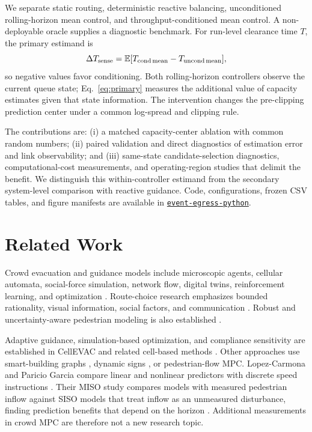 \documentclass[conference]{IEEEtran}
\newcommand{\cond}{\mathrm{cond}}
\newcommand{\uncond}{\mathrm{uncond}}
\begin{document}
We separate static routing, deterministic reactive balancing, unconditioned rolling-horizon mean control, and throughput-conditioned mean control. A non-deployable oracle supplies a diagnostic benchmark. For run-level clearance time $T$, the primary estimand is
\begin{equation}
\Delta T_{\rm sense}=\mathbb E[T_{\cond\,\rm mean}-T_{\uncond\,\rm mean}],
\label{eq:primary}
\end{equation}
so negative values favor conditioning. Both rolling-horizon controllers observe the current queue state; Eq.~\eqref{eq:primary} measures the additional value of capacity estimates given that state information. The intervention changes the pre-clipping prediction center under a common log-spread and clipping rule.

The contributions are: (i) a matched capacity-center ablation with common random numbers; (ii) paired validation and direct diagnostics of estimation error and link observability; and (iii) same-state candidate-selection diagnostics, computational-cost measurements, and operating-region studies that delimit the benefit. We distinguish this within-controller estimand from the secondary system-level comparison with reactive guidance. Code, configurations, frozen CSV tables, and figure manifests are available in \href{https://github.com/skcKenneth/event-egress-python}{\texttt{event-egress-python}}.

\section{Related Work}
Crowd evacuation and guidance models include microscopic agents, cellular automata, social-force simulation, network flow, digital twins, reinforcement learning, and optimization \cite{owaidah2019review,zhou2019simulation,han2020smart,xie2025coordinating}. Route-choice research emphasizes bounded rationality, visual information, social factors, and communication \cite{tong2022principles,wang2021modeling,templeton2024agent}. Robust and uncertainty-aware pedestrian modeling is also established \cite{ibrahim2017uncertainty,cristiani2019robust}.

Adaptive guidance, simulation-based optimization, and compliance sensitivity are established in CellEVAC and related cell-based methods \cite{lpezcarmona2021cellevac,lopez2022adaptive}. Other approaches use smart-building graphs \cite{nguyen2022smart}, dynamic signs \cite{li2022dynamic}, or pedestrian-flow MPC. Lopez-Carmona and Paricio Garcia compare linear and nonlinear predictors with discrete speed instructions \cite{lpezcarmona2023linear}. Their MISO study compares models with measured pedestrian inflow against SISO models that treat inflow as an unmeasured disturbance, finding prediction benefits that depend on the horizon \cite{lopez2023miso}. Additional measurements in crowd MPC are therefore not a new research topic.
\end{document}
